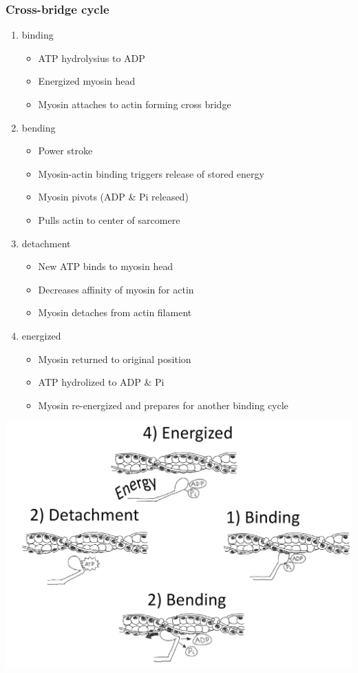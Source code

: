 \documentclass[11pt,fleqn]{book}
\begin{document}
\subsubsection{Cross-bridge cycle}
\begin{enumerate}
    \item binding
    \begin{itemize}
        \item ATP hydrolysius to ADP
        \item Energized myosin head
        \item Myosin attaches to actin forming cross bridge
    \end{itemize}
    \item bending
    \begin{itemize}
        \item Power stroke
        \item Myosin-actin binding triggers release of stored energy
        \item Myosin pivots (ADP \& Pi released)
        \item Pulls actin to center of sarcomere
    \end{itemize}
    \item detachment
    \begin{itemize}
        \item New ATP binds to myosin
head
        \item Decreases affinity of myosin
for actin
        \item Myosin detaches from actin
filament
    \end{itemize}
    \item energized
    \begin{itemize}
        \item Myosin returned to original
position
        \item ATP hydrolized to ADP \& Pi
        \item Myosin re-energized and
prepares for another binding
cycle
    \end{itemize}
\end{enumerate}
\begin{center}
    \includegraphics[width=0.65\linewidth]{Pictures/Screenshot 2024-04-03 223633.png}
\end{center}
\end{document}
